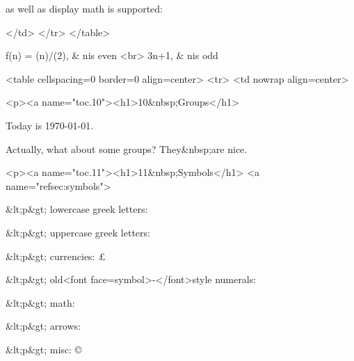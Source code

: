 as well as display math is supported:

  </td>
</tr>
</table>

f(n) = \begincases (n)/(2), & \textif  n\text is even <br>
 3n+1, & \textif  n\text is odd \endcases

<table cellspacing=0  border=0 align=center>
<tr>
  <td nowrap align=center>
    


<p><a name="toc.10"><h1>10&nbsp;Groups</h1>


Today is \today.

Actually, what about  some groups?  They&nbsp;are     nice.


<p><a name="toc.11"><h1>11&nbsp;Symbols</h1>
<a name="refsec:symbols">
    

&lt;p&gt;
lowercase greek letters:
\textalpha \textbeta \textgamma \textdelta \textepsilon \textzeta \texteta \texttheta \textiota \textkappa
\textlambda \textmu \textnu \textxi \textomikron \textpi \textrho \textsigma \texttau \textupsilon \textphi \textchi
\textpsi \textomega

&lt;p&gt;
uppercase greek letters:
\textAlpha \textBeta \textGamma \textDelta \textEpsilon \textZeta \textEta \textTheta \textIota \textKappa
\textLambda \textMu \textNu \textXi \textOmikron \textPi \textRho \textSigma \textTau \textUpsilon \textPhi \textChi
\textPsi \textOmega

&lt;p&gt;
currencies:
\texteuro \textcent \textsterling \pounds \textbaht \textcolonmonetary \textcurrency \textdong \textflorin \textlira
\textnaira \textpeso \textwon \textyen

&lt;p&gt;
old<font face=symbol>-</font>style numerals:
\textzerooldstyle \textoneoldstyle \texttwooldstyle \textthreeoldstyle \textfouroldstyle \textfiveoldstyle
\textsixoldstyle \textsevenoldstyle \texteightoldstyle \textnineoldstyle

&lt;p&gt;
math:
\textperthousand \perthousand \textpertenthousand \textonehalf \textthreequarters \textonequarter
\textfractionsolidus \textdiv \texttimes \textminus \textpm \textsurd \textlnot \textasteriskcentered
\textonesuperior \texttwosuperior \textthreesuperior

&lt;p&gt;
arrows:
\textleftarrow \textuparrow \textrightarrow \textdownarrow

&lt;p&gt;
misc:
\checkmark \textreferencemark \textordfeminine \textordmasculine \textmarried \textdivorced \textbar \textbardbl
\textbrokenbar \textbigcircle \textcopyright \copyright \textcircledP \textregistered \textservicemark
\texttrademark \textnumero \textrecipe \textestimated \textmusicalnote \textdiscount

